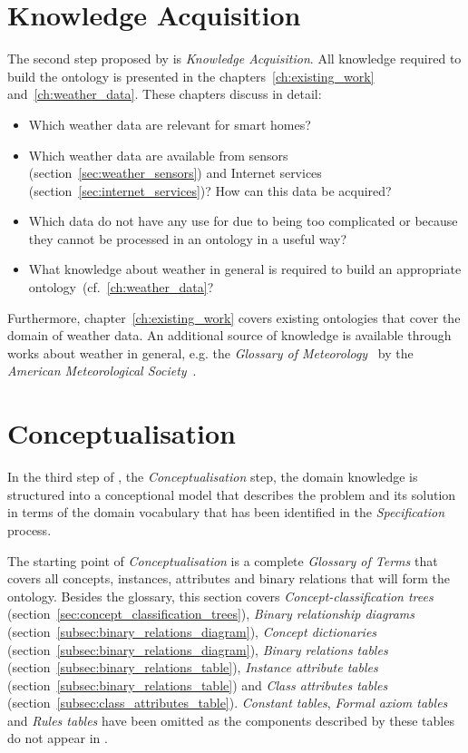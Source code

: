\section{Knowledge Acquisition}

The second step proposed by \methontology is \emph{Knowledge Acquisition}. All knowledge required to build the \smarthomeweather ontology is presented in the chapters~\ref{ch:existing_work} and~\ref{ch:weather_data}. These chapters discuss in detail:

\begin{itemize}
  \item Which weather data are relevant for smart homes?
  \item Which weather data are available from sensors (section~\ref{sec:weather_sensors}) and Internet services (section~\ref{sec:internet_services})? How can this data be acquired?
  \item Which data do not have any use for \smarthomeweather due to being too complicated or because they cannot be processed in an ontology in a useful way?
  \item What knowledge about weather in general is required to build an appropriate ontology~(cf.~\ref{ch:weather_data}?
\end{itemize}

Furthermore, chapter~\ref{ch:existing_work} covers existing ontologies that cover the domain of weather data. An additional source of knowledge is available through works about weather in general, e.g. the \emph{Glossary of Meteorology}~\cite{GlossaryOfMeteorology} by the \emph{American Meteorological Society}~\cite{AMS}.

\section{Conceptualisation}
\label{sec:ontology_concept}

In the third step of \methontology, the \emph{Conceptualisation} step, the domain knowledge is structured into a conceptional model that describes the problem and its solution in terms of the domain vocabulary that has been identified in the \emph{Specification} process.

The starting point of \emph{Conceptualisation} is a complete \emph{Glossary of Terms} that covers all concepts, instances, attributes and binary relations that will form the ontology. Besides the glossary, this section covers \emph{Concept-classification trees} (section~\ref{sec:concept_classification_trees}), \emph{Binary relationship diagrams} (section~\ref{subsec:binary_relations_diagram}), \emph{Concept dictionaries} (section~\ref{subsec:binary_relations_diagram}), \emph{Binary relations tables} (section~\ref{subsec:binary_relations_table}), \emph{Instance attribute tables} (section~\ref{subsec:binary_relations_table}) and \emph{Class attributes tables} (section~\ref{subsec:class_attributes_table}). \emph{Constant tables}, \emph{Formal axiom tables} and \emph{Rules tables} have been omitted as the components described by these tables do not appear in \smarthomeweather.

